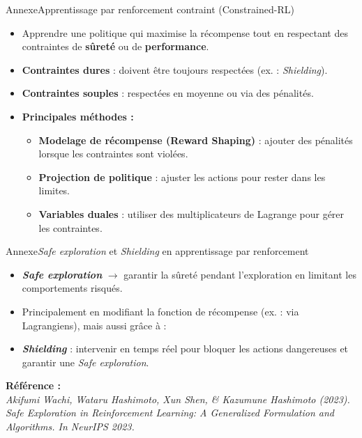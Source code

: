 \begin{frame}{Annexe}{Apprentissage par renforcement contraint (Constrained-RL)}

    \begin{itemize}
        \item Apprendre une politique qui maximise la récompense tout en respectant des contraintes de \textbf{sûreté} ou de \textbf{performance}.

        \item \textbf{Contraintes dures} : doivent être toujours respectées (ex. : \textit{Shielding}).
        \item \textbf{Contraintes souples} : respectées en moyenne ou via des pénalités.

        \item \textbf{Principales méthodes :}
              \begin{itemize}
                  \item \textbf{Modelage de récompense (Reward Shaping)} : ajouter des pénalités lorsque les contraintes sont violées.
                  \item \textbf{Projection de politique} : ajuster les actions pour rester dans les limites.
                  \item \textbf{Variables duales} : utiliser des multiplicateurs de Lagrange pour gérer les contraintes.
              \end{itemize}
    \end{itemize}

\end{frame}

\begin{frame}{Annexe}{\textit{Safe exploration} et \textit{Shielding} en apprentissage par renforcement}

    \begin{itemize}
        \item \textbf{\textit{Safe exploration}} $\rightarrow$ garantir la sûreté pendant l'exploration en limitant les comportements risqués.
        \item Principalement en modifiant la fonction de récompense (ex. : via Lagrangiens), mais aussi grâce à :
        \item \textbf{\textit{Shielding}} : intervenir en temps réel pour bloquer les actions dangereuses et garantir une \textit{Safe exploration}.
    \end{itemize}

    \textbf{Référence :} \\
    \textit{Akifumi Wachi, Wataru Hashimoto, Xun Shen, \& Kazumune Hashimoto (2023). Safe Exploration in Reinforcement Learning: A Generalized Formulation and Algorithms. In NeurIPS 2023.}

\end{frame}

